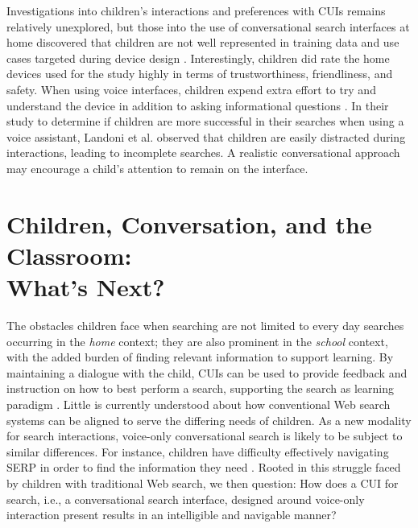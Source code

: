 \documentclass{sigchi-ext}
\begin{document}
Investigations into children's interactions and preferences with CUIs remains relatively unexplored, but those into the use of conversational search interfaces at home discovered that children are not well represented in training data and use cases targeted during device design \cite{lovato2019hey}. Interestingly, children did rate the home devices used for the study highly in terms of trustworthiness, friendliness, and safety. When using voice interfaces, children expend extra effort to try and understand the device in addition to asking informational questions \cite{lovato2015siri}. In their study to determine if children are more successful in their searches when using a voice assistant, Landoni et al. \cite{landoni2019sonny} observed that children are easily distracted during interactions, leading to incomplete searches. A realistic conversational approach may encourage a child's attention to remain on the interface.

\section{Children, Conversation, and the Classroom: \\What's Next?}

The obstacles children face when searching are not limited to every day searches occurring in the \textit{home} context; they are also prominent in the \textit{school} context, with the added burden of finding relevant information to support learning. By maintaining a dialogue with the child, CUIs can be used to provide feedback and instruction on how to best perform a search, supporting the search as learning paradigm \cite{collins2016assessing}. Little is currently understood about how conventional Web search systems can be aligned to serve the differing needs of children. As a new modality for search interactions, voice-only conversational search is likely to be subject to similar differences. For instance, children have difficulty effectively navigating SERP in order to find the information they need \cite{duarte2011and,foss2012children}. Rooted in this struggle faced by children with traditional Web search, we then question: How does a CUI for search, i.e., a conversational search interface, designed around voice-only interaction present results in an intelligible and navigable manner?
\end{document}

